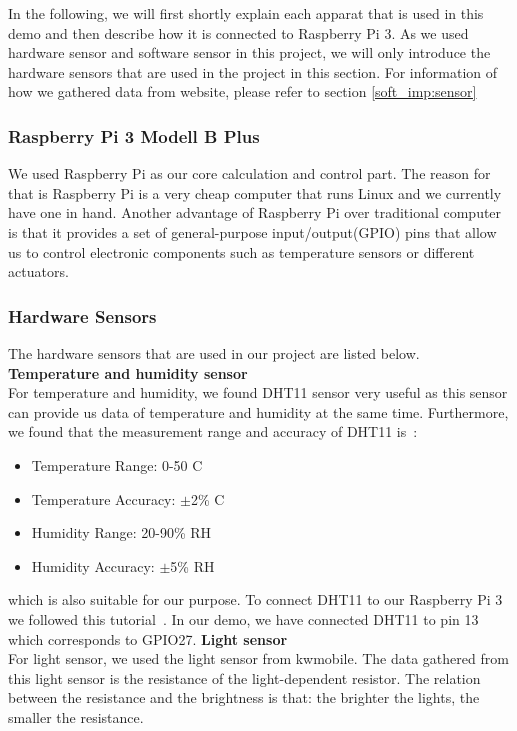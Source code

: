 \documentclass[runningheads]{llncs}
\begin{document}
In the following, we will first shortly explain each apparat that is used in this demo and then describe how it is connected to Raspberry Pi 3. As we used hardware sensor and software sensor in this project, we will only introduce the hardware sensors that are used in the project in this section. For information of how we gathered data from website, please refer to section \ref{soft_imp:sensor}

\subsubsection{Raspberry Pi 3 Modell B Plus}\hfill
\label{hard_imp:pi3}
\newline
We used Raspberry Pi as our core calculation and control part. The reason for that is Raspberry Pi is a very cheap computer that runs Linux and we currently have one in hand. Another advantage of Raspberry Pi over traditional computer is that it provides a set of general-purpose input/output(GPIO) pins that allow us to control electronic components such as temperature sensors or different actuators.

\subsubsection{Hardware Sensors}\hfill
\label{hard_imp:sensor}
\newline
The hardware sensors that are used in our project are listed below.
\newline
\textbf{Temperature and humidity sensor~\cite{th_sensor}}\\
For temperature and humidity, we found DHT11 sensor very useful as this sensor can provide us data of temperature and humidity at the same time. Furthermore, we found that the measurement range and accuracy of DHT11 is~\cite{th_data}:
\begin{itemize}
\item Temperature Range: 0-50 \textdegree{}C
\item Temperature Accuracy: $\pm$2\% \textdegree{}C 
\item Humidity Range: 20-90\% RH
\item Humidity Accuracy: $\pm$5\% RH
\end{itemize}
which is also suitable for our purpose. To connect DHT11 to our Raspberry Pi 3 we followed this tutorial~\cite{th_tutorial}. In our demo, we have connected DHT11 to pin 13 which corresponds to GPIO27.
\newline
\textbf{Light sensor~\cite{l_sensor}}\\
For light sensor, we used the light sensor from kwmobile. The data gathered from this light sensor is the resistance of the light-dependent resistor. The relation between the resistance and the brightness is that: the brighter the lights, the smaller the resistance.
\end{document}
